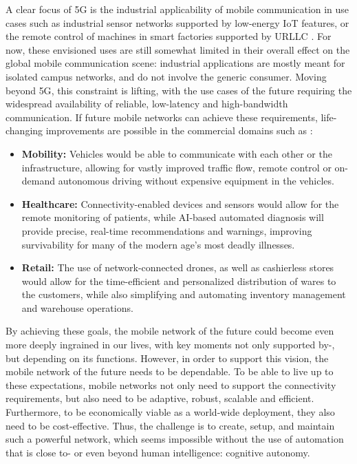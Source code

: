 	A clear focus of \ac{5G} is the industrial applicability of mobile communication in use cases such as industrial sensor networks supported by low-energy \ac{IoT} features, or the remote control of machines in smart factories supported by \ac{URLLC} \cite{ngmn_5g_white_paper}.
	For now, these envisioned uses are still somewhat limited in their overall effect on the global mobile communication scene: industrial applications are mostly meant for isolated campus networks, and do not involve the generic consumer.	
	Moving beyond \ac{5G}, this constraint is lifting, with the use cases of the future requiring the widespread availability of reliable, low-latency and high-bandwidth communication.	
	If future mobile networks can achieve these requirements, life-changing improvements are possible in the commercial domains such as \cite{5g+_discussion_paper}:
	\begin{itemize}
		\item
			\textbf{Mobility:}
			Vehicles would be able to communicate with each other or the infrastructure, allowing for vastly improved traffic flow, remote control or on-demand autonomous driving without expensive equipment in the vehicles.
			
		\item
			\textbf{Healthcare:} 
			Connectivity-enabled devices and sensors would allow for the remote monitoring of patients, while \ac{AI}-based automated diagnosis will provide precise, real-time recommendations and warnings, improving survivability for many of the modern age's most deadly illnesses.
			
		\item
			\textbf{Retail:}
			The use of network-connected drones, as well as cashierless stores would allow for the time-efficient and personalized distribution of wares to the customers, while also simplifying and automating inventory management and warehouse operations.
	\end{itemize}
	
	By achieving these goals, the mobile network of the future could become even more deeply ingrained in our lives, with key moments not only supported by-, but depending on its functions.
	However, in order to support this vision, the mobile network of the future needs to be dependable.
	To be able to live up to these expectations, mobile networks not only need to support the connectivity requirements, but also need to be adaptive, robust, scalable and efficient.
	Furthermore, to be economically viable as a world-wide deployment, they also need to be cost-effective.
	Thus, the challenge is to create, setup, and maintain such a powerful network, which seems impossible without the use of automation that is close to- or even beyond human intelligence:
	cognitive autonomy.

